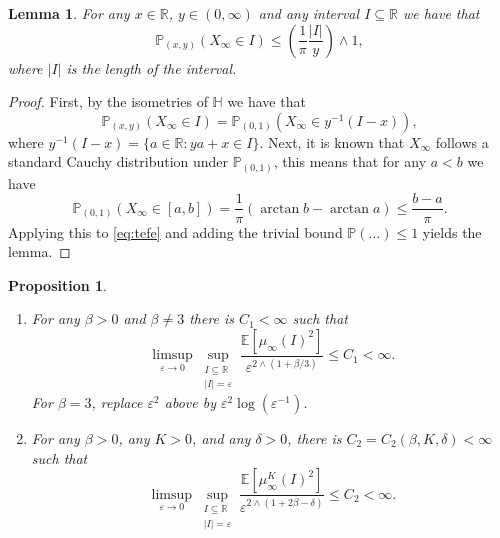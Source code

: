 \documentclass{article}
\newtheorem{lem}[thm]{Lemma}
\newtheorem{prop}[thm]{Proposition}
\theoremstyle{definition}
\numberwithin{equation}{section}
\numberwithin{thm}{section}
\newcommand*{\eps}{\ensuremath{\varepsilon}}            %
\newcommand*{\RR}{\ensuremath{\mathbb{R}}}	        	%
\newcommand*{\EE}{\ensuremath{\mathbb{E}}}	        	%
\newcommand*{\PP}{\ensuremath{\mathbb{P}}}	        	%
\newcommand*{\HH}{\ensuremath{\mathbb{H}}}	        	%
\begin{document}
\begin{lem}\label{lem:bound_on_bm}
    For any $x\in \RR$, $y\in (0,\infty)$ and any interval $I\subseteq \RR$ we have that
    \begin{equation*}
        \PP_{(x,y)} (X_\infty\in I)\leq\left( \frac{1}{\pi} \frac{\vert I \vert}{y} \right)\wedge 1,
    \end{equation*}
    {where $\vert I \vert$ is the length of the interval.}
\end{lem}

\begin{proof}
    First, by the isometries of $\HH$ we have that
    \begin{equation}\label{eq:tefe}
        \PP_{(x,y)} (X_\infty\in I) = \PP_{(0,1)} (X_\infty\in y^{-1}(I-x)),
    \end{equation}
    where $y^{-1}(I-x)=\{a\in \RR:ya+x\in I\}$. Next, it is known that $X_\infty$ follows a standard Cauchy distribution under $\PP_{(0,1)}$, this means that for any $a<b$ we have
    \begin{equation*}
        \PP_{(0,1)}(X_\infty \in [a,b]) =  \frac{1}{\pi}\left(\arctan b - \arctan a\right) \leq \frac{b-a}{\pi}.
    \end{equation*}
    Applying this to \eqref{eq:tefe} and adding the trivial bound $\PP(\ldots)\leq 1$ yields the lemma.
\end{proof}

\begin{prop}\label{prop:2nd_moment} $\hspace{1cm} $
    \begin{enumerate}
        \item [(i)]
    For any $\beta>0$ and $\beta \neq 3$ there is $C_1<\infty$ such that
    \begin{equation*}
        \limsup_{\eps \to 0} \sup_{\substack{I\subseteq \RR \\ \vert I \vert =\eps}} \frac{\EE\left[ \mu_\infty(I)^2\right]}{\eps^{2 \wedge(1+\beta/3)}} \leq C_1<\infty.
    \end{equation*}
    For $\beta=3$, replace $\eps^2$ above by $\eps^2 \log(\eps^{-1})$.

    \item [(ii)]
    For any $\beta>0 $, any $K>0$, and any $\delta>0$, there is $C_2=C_2(\beta, K, \delta)<\infty$ such that 
    \begin{equation*}
        \limsup_{\eps \to 0} \sup_{\substack{I\subseteq \RR \\ \vert I \vert =\eps}} \frac{\EE\left[ \mu^K_\infty(I)^2\right]}{\eps^{2 \wedge(1+2\beta-\delta)}} \leq C_2<\infty.
    \end{equation*}

    \end{enumerate}
\end{prop}
\end{document}
